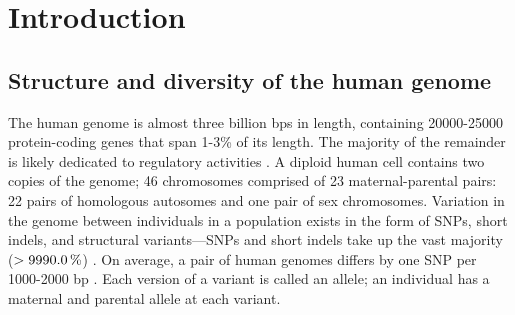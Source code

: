 %
%


\chapter{Introduction}

\begin{outline}

\section{Structure and diversity of the human genome}

\1 The human genome is almost three billion \glspl{bp} in length, containing 20000-25000 protein-coding genes \autocite{1000genomesprojectconsortium2015GlobalReferenceHuman,theencodeprojectconsortium2012IntegratedEncyclopediaDNA} that span 1-3\% of its length.
The majority of the remainder is likely dedicated to regulatory activities \autocite{theencodeprojectconsortium2012IntegratedEncyclopediaDNA}.
A diploid human cell contains two copies of the genome; 46 chromosomes comprised of 23 maternal-parental pairs: 22 pairs of homologous autosomes and one pair of sex chromosomes.
%
\1 Variation in the genome between individuals in a population exists in the form of \glspl{SNP}, short indels, and structural variants---\glspl{SNP} and short indels take up the vast majority ($> \percentage{99.9}$) \autocite{1000genomesprojectconsortium2015GlobalReferenceHuman}.
On average, a pair of human genomes differs by one \gls{SNP} per 1000-2000 \gls{bp} \autocite{theinternationalsnpmapworkinggroup2001MapHumanGenome}.
Each version of a variant is called an allele; an individual has a maternal and parental allele at each variant.


\end{outline}
